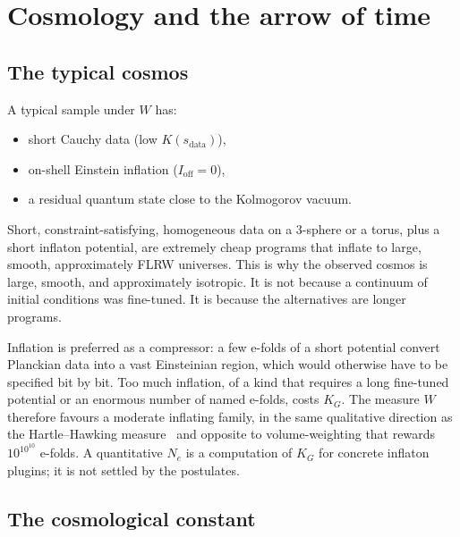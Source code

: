 \documentclass[11pt,a4paper]{article}
\theoremstyle{plain}
\theoremstyle{definition}
\theoremstyle{remark}
\newcommand{\KG}{K_{G}}
\begin{document}
\section{Cosmology and the arrow of time}
\label{sec:cosmo}

\subsection{The typical cosmos}

A typical sample under $W$ has:
\begin{itemize}
  \item short Cauchy data (low $K(s_{\mathrm{data}})$),
  \item on-shell Einstein inflation ($I_{\mathrm{off}}=0$),
  \item a residual quantum state close to the Kolmogorov vacuum.
\end{itemize}
Short, constraint-satisfying, homogeneous data on a $3$-sphere or a torus, plus a short inflaton potential, are extremely cheap programs that inflate to large, smooth, approximately FLRW universes.
This is why the observed cosmos is large, smooth, and approximately isotropic.
It is not because a continuum of initial conditions was fine-tuned.
It is because the alternatives are longer programs.

Inflation is preferred as a compressor: a few e-folds of a short potential convert Planckian data into a vast Einsteinian region, which would otherwise have to be specified bit by bit.
Too much inflation, of a kind that requires a long fine-tuned potential or an enormous number of named e-folds, costs $\KG$.
The measure $W$ therefore favours a moderate inflating family, in the same qualitative direction as the Hartle--Hawking measure~\cite{hartle2008} and opposite to volume-weighting that rewards $10^{10^{10}}$ e-folds.
A quantitative $N_{e}$ is a computation of $\KG$ for concrete inflaton plugins; it is not settled by the postulates.

\subsection{The cosmological constant}
\end{document}
